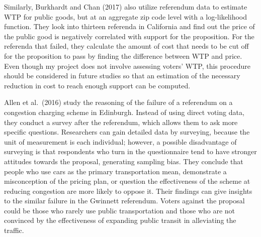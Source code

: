 \documentclass[
]{article}
\begin{document}
Similarly, Burkhardt and Chan (2017) also utilize referendum data to
estimate WTP for public goods, but at an aggregate zip code level with a
log-likelihood function. They look into thirteen referenda in California
and find out the price of the public good is negatively correlated with
support for the proposition. For the referenda that failed, they
calculate the amount of cost that needs to be cut off for the
proposition to pass by finding the difference between WTP and price.
Even though my project does not involve assessing voters' WTP, this
procedure should be considered in future studies so that an estimation
of the necessary reduction in cost to reach enough support can be
computed.

Allen et al.~(2016) study the reasoning of the failure of a referendum
on a congestion charging scheme in Edinburgh. Instead of using direct
voting data, they conduct a survey after the referendum, which allows
them to ask more specific questions. Researchers can gain detailed data
by surveying, because the unit of measurement is each individual;
however, a possible disadvantage of surveying is that respondents who
turn in the questionnaire tend to have stronger attitudes towards the
proposal, generating sampling bias. They conclude that people who use
cars as the primary transportation mean, demonstrate a misconception of
the pricing plan, or question the effectiveness of the scheme at
reducing congestion are more likely to oppose it. Their findings can
give insights to the similar failure in the Gwinnett referendum. Voters
against the proposal could be those who rarely use public transportation
and those who are not convinced by the effectiveness of expanding public
transit in alleviating the traffic.
\end{document}
